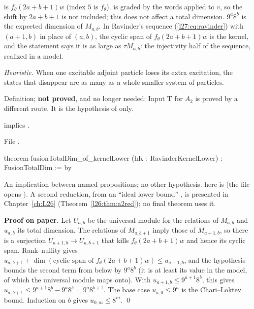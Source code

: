 \begin{dictionary}
 is $f_\theta(2a+b+1)w$ (index $5$ is $f_\theta$).  is graded by the words applied to
$v$, so the shift by $2a+b+1$ is not included; this does not affect a total dimension. $9^a8^b$ is the expected dimension of
$M_{a,b}$. In Ravinder's sequence (\ref{l27:eq:ravinder}) with $(a+1,b)$ in place of $(a,b)$, the cyclic span of
$f_\theta(2a+b+1)w$ is the kernel, and the statement says it is as large as $\tau M_{a,b}$: the injectivity half of the sequence,
realized in a model.
\end{dictionary}

\begin{physics}
\emph{Heuristic.} When one excitable adjoint particle loses its extra excitation, the states that disappear are as many as a
whole smaller system of particles.
\end{physics}

\begin{status}
Definition; \textbf{not proved}, and no longer needed: Input T for $A_2$ is proved by a different route. It is the hypothesis of
 only.
\end{status}

\begin{theorem}\label{l27:thm:a2alt}
 implies .
\end{theorem}
\noindent File .
\begin{leancode}
theorem fusionTotalDim_of_kernelLower (hK : RavinderKernelLower) : FusionTotalDim := by
\end{leancode}

\begin{dictionary}
An implication between named propositions; no other hypothesis.  here is 
(the file opens ). A second reduction, from an ``ideal lower bound'' , is presented in
Chapter~\ref{ch:L26} (Theorem~\ref{l26:thm:a2red}); no final theorem uses it.
\end{dictionary}

\textbf{Proof on paper.} Let $U_{a,b}$ be the universal module for the relations of $M_{a,b}$ and $u_{a,b}$ its total
dimension. The relations of $M_{a,b+1}$ imply those of $M_{a+1,b}$, so there is a surjection $U_{a+1,b}\to U_{a,b+1}$ that kills
$f_\theta(2a+b+1)w$ and hence its cyclic span. Rank--nullity gives $u_{a,b+1}+\dim(\text{cyclic span of }f_\theta(2a+b+1)w)\le
u_{a+1,b}$, and the hypothesis bounds the second term from below by $9^a8^b$ (it is at least its value in the model, of which the
universal module maps onto). With $u_{a+1,b}\le9^{a+1}8^b$, this gives $u_{a,b+1}\le9^{a+1}8^b-9^a8^b=9^a8^{b+1}$. The base case
$u_{a,0}\le9^a$ is the Chari--Loktev bound. Induction on $b$ gives $u_{0,m}\le8^m$. \qed


